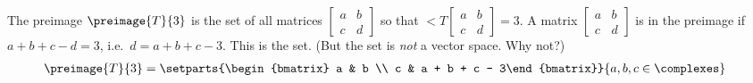 The preimage $\preimage{T}{3}$ is the set of all matrices 
$\begin{bmatrix} a & b\\c & d\end{bmatrix}$ 
so that 
$\lt{T}{\begin{bmatrix}a & b \\ c & d \end{bmatrix}} = 3$.  
A matrix 
$\begin{bmatrix} a & b\\ c & d \end{bmatrix}$ 
is in the preimage if 
$a + b + c - d = 3$, 
i.e.\ $d = a + b + c - 3$.
This is the set. (But the set is {\em not} a vector space. Why not?)
%
\begin{align*}
\preimage{T}{3} &= 
\setparts{\begin{bmatrix} a & b \\ c & a + b + c - 3\end{bmatrix}}{a,b,c\in\complexes}
\end{align*}

